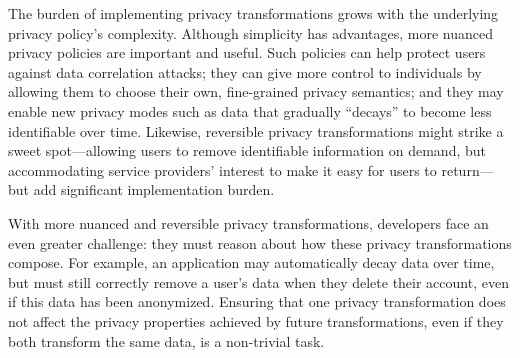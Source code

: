 \iffalse
To get privacy transformations right, developers must carefully map the high-level privacy
policy to operations that delete or rewrite data objects, while ensuring that the application preserves
utility for other users, retains legally-mandated anonymized data, and avoids violating
application invariants.
%
For example, deleting a user's account should not unexpectedly grant broad
access to previously-private content by deleting objects that restrict access,
nor should it make non-sensitive shared content disappear.
%
Privacy transformation designers must correctly handle identifying data, as well as indirectly identifying
correlations between data objects.
For example, anonymized public running routes can identify the user's hometown and be
reassociated with the user~\cite{strava:heatmap},
and anonymized order histories in e-commerce sites can reidentify buyers.
\fi

%
The burden of implementing privacy transformations grows with the underlying privacy policy's
complexity.
%
Although simplicity has advantages, more nuanced privacy policies are important and useful.
%
Such policies can help protect users against data correlation attacks; they can give more
control to individuals by allowing them to choose their own, fine-grained privacy semantics; and
they may enable new privacy modes such as data that gradually ``decays'' to become less identifiable over time.
%
Likewise, reversible privacy transformations might strike a sweet
spot---allowing users to remove identifiable information on demand,
but accommodating service providers' interest to make it easy for users to return---but
add significant implementation burden.
%

%
With more nuanced and reversible privacy transformations, developers face an even greater challenge:
they must reason about how these privacy transformations compose. For example, an application may
automatically decay data over time, but must still correctly remove a user's data when they delete
their account, even if this data has been anonymized. 
Ensuring that one privacy transformation does not affect the privacy properties
achieved by future transformations, even if they both transform the same data, is a non-trivial task.
%

